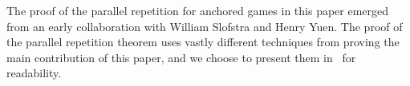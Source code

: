 The proof of the parallel repetition for anchored games in this paper emerged from an early collaboration with William Slofstra and Henry Yuen. The proof of the parallel repetition theorem uses vastly different techniques from proving the main contribution of this paper, and we choose to present them in~ for readability. 


